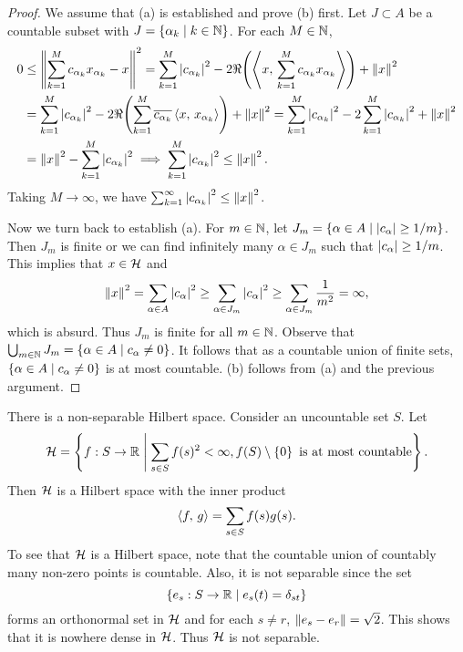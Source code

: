 \begin{proof}
    We assume that (a) is established and prove (b) first. 
    Let $J\subset A$ be a countable subset with $J = \left\{ \alpha_k \;\middle\vert\; k\in\mathbb{N} \right\}$. 
    For each $M\in\mathbb{N}$, 
    \begin{equation*}
        \begin{split}
            0 &\leq \norm{\sum_{k=1}^{M} c_{\alpha_k}x_{\alpha_k} - x}^2 
            = \sum_{k=1}^{M}\abs{c_{\alpha_k}}^2 - 2\Re\pth{\inp{x}{\sum_{k=1}^{M}c_{\alpha_k}x_{\alpha_k}}} + \norm{x}^2 \\
            &= \sum_{k=1}^{M}\abs{c_{\alpha_k}}^2 - 2\Re\pth{\sum_{k=1}^{M}\overline{c_{\alpha_k}}\inp{x}{x_{\alpha_k}}} + \norm{x}^2 
            = \sum_{k=1}^{M}\abs{c_{\alpha_k}}^2 - 2\sum_{k=1}^{M}\abs{c_{\alpha_k}}^2 + \norm{x}^2 \\
            &= \norm{x}^2 - \sum_{k=1}^{M}\abs{c_{\alpha_k}}^2 \implies \sum_{k=1}^{M}\abs{c_{\alpha_k}}^2 \leq \norm{x}^2.
        \end{split}
    \end{equation*}
    Taking $M\to\infty$, we have $\sum_{k=1}^{\infty}\left\lvert {c_{\alpha_k}} \right\rvert^2 \leq \left\lVert {x} \right\rVert^2$. 

    Now we turn back to establish (a). For $m\in\mathbb{N}$, let $J_m = \left\{ \alpha\in A \;\middle\vert\; \left\lvert {c_\alpha} \right\rvert \geq 1/m \right\}$. 
    Then $J_m$ is finite or we can find infinitely many $\alpha\in J_m$ such that $\left\lvert {c_\alpha} \right\rvert \geq 1/m$. 
    This implies that $x\in\mathcal{H}$ and 
    \begin{equation*}
        \left\lVert {x} \right\rVert^2 = \sum_{\alpha\in A}\left\lvert {c_\alpha} \right\rvert^2 \geq \sum_{\alpha\in J_m}\left\lvert {c_\alpha} \right\rvert^2 \geq \sum_{\alpha\in J_m} \frac{1}{m^2} = \infty,
    \end{equation*}
    which is absurd. Thus $J_m$ is finite for all $m\in\mathbb{N}$. 
    Observe that $\bigcup_{m\in\mathbb{N}} J_m = \left\{ \alpha\in A \;\middle\vert\; c_\alpha\neq 0 \right\}$. 
    It follows that as a countable union of finite sets, $\left\{ \alpha\in A \;\middle\vert\; c_\alpha\neq 0 \right\}$ 
    is at most countable. (b) follows from (a) and the previous argument.
\end{proof}
\begin{remark}
    There is a non-separable Hilbert space. Consider an uncountable 
    set $S$. Let 
    \begin{equation*}
        \mathcal{H} = \left\{ f:S\to\mathbb{R} \;\middle\vert\; \sum_{s\in S}f(s)^2 < \infty, f(S)\setminus\left\{ {0} \right\}\text{ is at most countable} \right\}.
    \end{equation*}
    Then $\mathcal{H}$ is a Hilbert space with the inner product 
    \begin{equation*}
        \left\langle {f},\, {g} \right\rangle = \sum_{s\in S}f(s)g(s).
    \end{equation*}
    To see that $\mathcal{H}$ is a Hilbert space, note that the countable 
    union of countably many non-zero points is countable. Also, 
    it is not separable since the set 
    \begin{equation*}
        \left\{ e_s:S\to\mathbb{R} \;\middle\vert\; e_s(t) = \delta_{st} \right\}
    \end{equation*}
    forms an orthonormal set in $\mathcal{H}$ and for each $s\neq r$,
    $\left\lVert {e_s - e_r} \right\rVert = \sqrt{2}$. This shows that it is nowhere 
    dense in $\mathcal{H}$. Thus $\mathcal{H}$ is not separable.
\end{remark}

